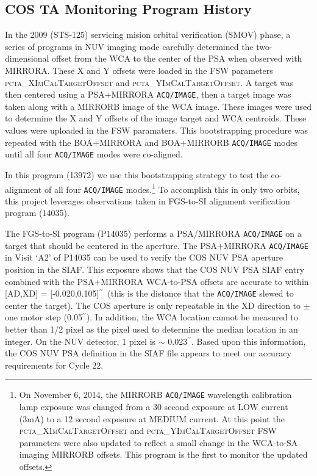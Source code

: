 \documentclass{stsci_report}
\def\arcsec{\hbox{$^{\prime\prime}$}}
\newcommand{\tacq}[1]{\texttt{ACQ/#1}}
\begin{document}
\subsection{COS TA Monitoring Program History}\label{subsec:History}
In the 2009 (STS-125) servicing mision orbital verification (SMOV) phase, a series of programs in NUV imaging mode carefully determined the two-dimensional offset from the WCA to the center of the PSA when observed with MIRRORA.
These X and Y offsets were loaded in the FSW parameters \textsc{pcta\_XImCalTargetOffset} and \textsc{pcta\_YImCalTargetOffset}.
A target was then centered using a PSA+MIRRORA \tacq{IMAGE}, then a target image was taken along with a MIRRORB image
of the WCA image. These images were used to determine the X and Y offsets of the image target and WCA centroids.
These values were uploaded in the FSW paramaters. This bootstrapping procedure was repeated with the BOA+MIRRORA
and BOA+MIRRORB \tacq{IMAGE} modes until all four \tacq{IMAGE} modes were co-aligned.

In this program (13972) we use this bootstrapping strategy to test the co-alignment of all four \tacq{IMAGE} modes.\footnote{On November 6, 2014,
the MIRRORB \tacq{IMAGE} wavelength calibration lamp exposure was changed from a 30 second exposure
at LOW current (3mA) to a 12 second exposure at MEDIUM current. At this point the \textsc{pcta\_XImCalTargetOffset} and \textsc{pcta\_YImCalTargetOffset}
FSW parameters were also updated to reflect a small change in the WCA-to-SA imaging MIRRORB offsets. This program is the first
to monitor the updated offsets.}
To accomplish this in only two orbits, this project leverages observations taken in FGS-to-SI alignment verification program (14035).

The FGS-to-SI program (P14035) performs a PSA/MIRRORA \tacq{IMAGE} on a target that should be centered in the aperture.
The PSA+MIRRORA \tacq{IMAGE} in Visit `A2' of P14035 can be used to verify the COS NUV PSA aperture position in the SIAF.
This exposure shows that the COS NUV PSA SIAF entry combined with the PSA+MIRRORA WCA-to-PSA offsets are
accurate to within [AD,XD] = [-0.020,0.105]\arcsec\ (this is the distance that the \tacq{IMAGE} slewed to center the target).
The COS aperture is only repeatable in the XD direction to $\pm$ one motor step (0.05\arcsec). In addition, the WCA location
cannot be measured to better than 1/2 pixel as the pixel used to determine the median location in an integer.
On the NUV detector, 1 pixel is $\sim$ 0.023\arcsec. Based upon this information, the COS NUV PSA definition
in the SIAF file appears to meet our accuracy requirements for Cycle 22.
\end{document}
